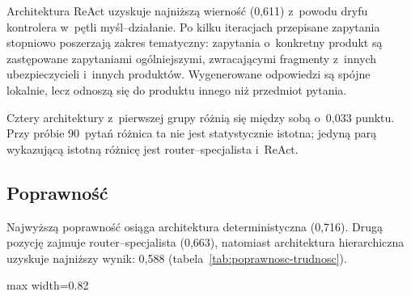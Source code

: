 Architektura ReAct uzyskuje najniższą wierność (0{,}611) z~powodu dryfu
kontrolera w~pętli myśl--działanie. Po kilku iteracjach przepisane zapytania
stopniowo poszerzają zakres tematyczny: zapytania o~konkretny produkt są
zastępowane zapytaniami ogólniejszymi, zwracającymi fragmenty z~innych
ubezpieczycieli i~innych produktów. Wygenerowane odpowiedzi są spójne lokalnie,
lecz odnoszą się do produktu innego niż przedmiot pytania.

Cztery architektury z~pierwszej grupy różnią się między sobą o~0{,}033 punktu.
Przy próbie 90~pytań różnica ta nie jest statystycznie istotna; jedyną parą
wykazującą istotną różnicę jest router--specjalista i~ReAct.

\subsection{Poprawność}\label{subsec:poprawnosc}

Najwyższą poprawność osiąga architektura deterministyczna (0{,}716). Drugą
pozycję zajmuje router--specjalista (0{,}663), natomiast architektura
hierarchiczna uzyskuje najniższy wynik: 0{,}588
(tabela~\ref{tab:poprawnosc-trudnosc}).

\begin{wykres}[H]
  \caption{Poprawność według architektury}\label{wykres:poprawnosc-per-architektura}
  \centering
  \begin{adjustbox}{max width=0.82\textwidth}
  \end{adjustbox}
\end{wykres}

